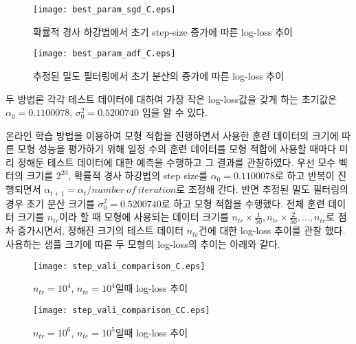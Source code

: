 \documentclass[oneside,b5paper,11pt]{book}
\theoremstyle{plain}
\theoremstyle{definition}
\theoremstyle{remark}
\theoremstyle{definition}
\numberwithin{equation}{chapter}
\begin{document}
\begin{figure}[!ht]
    \begin{center}
    \texttt{[image: best\_param\_sgd\_C.eps]} %
    \end{center}
    \caption{{\small 확률적 경사 하강법에서 초기 step-size 증가에 따른 log-loss 추이}}
\end{figure}

\begin{figure}[!ht]
    \begin{center}
    \texttt{[image: best\_param\_adf\_C.eps]} %
    \end{center}
    \caption{{\small 추정된 밀도 필터링에서 초기 분산의  증가에 따른 log-loss 추이}}
\end{figure}

 두 방법론 각각 테스트 데이터에 대하여 가장 작은 log-loss값을 갖게 하는 초기값은 $\alpha_0 = 0.1100078$, $\sigma_0^2 = 0.5200740$ 임을 알 수 있다.


 온라인 학습 방법을 이용하여 모형 적합을 진행하면서 사용한 훈련 데이터의 크기에 따른 모형 성능을 평가하기 위해 일정 수의 훈련 데이터를 모형 적합에 사용할 때마다 미리 정해둔 테스트 데이터에 대한 예측을 수행하고 그 결과를 관찰하였다. 우선 모수 벡터의 크기를 $2^{20}$, 확률적 경사 하강법의 step size를  $\alpha_0 = 0.1100078$로 하고 반복이 진행되면서 $\alpha_{t+1} = {\alpha_{t}}/{number~ of~ iteration}$로 조정해 간다. 반면 추정된 밀도 필터링의 경우 초기 분산 크기를 $\sigma_0^2 = 0.5200740$로 하고 모형 적합을 수행했다. 전체 훈련 데이터 크기를 $n_{tr}$이라 할 때 모형에 사용되는 데이터 크기를 $n_{tr} \times \frac{1}{50}, n_{tr} \times \frac{2}{50}, ... , n_{tr}$로 점차 증가시면서, 정해진 크기의 테스트 데이터 $n_{te}$건에 대한 log-loss 추이를 관찰 했다.
 사용하는 샘플 크기에 따른 두 모형의 log-loss의 추이는 아래와 같다.

\begin{figure}[!ht]
    \begin{center}
    \texttt{[image: step\_vali\_comparison\_C.eps]} %
    \end{center}
    \caption{{\small $n_{tr} = 10^4$, $n_{te} = 10^4$일때 log-loss 추이}}
\end{figure}

\begin{figure}[!ht]
    \begin{center}
    \texttt{[image: step\_vali\_comparison\_CC.eps]} %
    \end{center}
    \caption{{\small $n_{tr} = 10^6$, $n_{te} = 10^5$일때 log-loss 추이}}
\end{figure}
\end{document}
